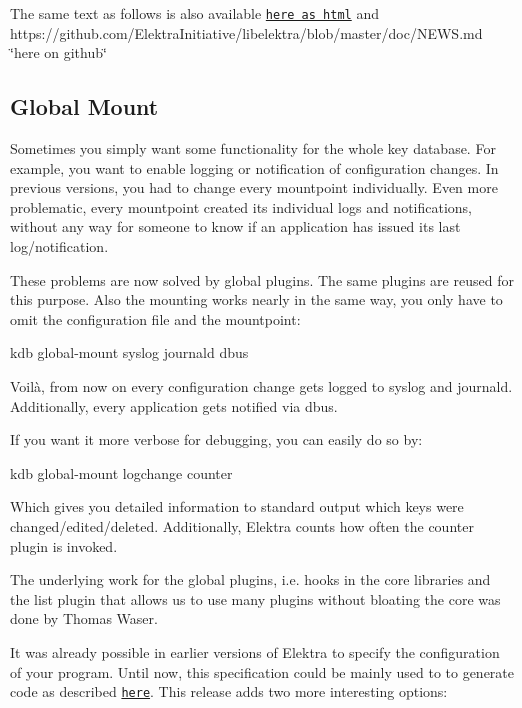 The same text as follows is also available \href{http://doc.libelektra.org/news/1ab4a560-c286-46d2-a058-1a8e7e208fe8.html}{\tt here as html} and https\+://github.com/\+Elektra\+Initiative/libelektra/blob/master/doc/\+N\+E\+W\+S.\+md \char`\"{}here on github\char`\"{}

\subsection*{Global Mount}

Sometimes you simply want some functionality for the whole key database. For example, you want to enable logging or notification of configuration changes. In previous versions, you had to change every mountpoint individually. Even more problematic, every mountpoint created its individual logs and notifications, without any way for someone to know if an application has issued its last log/notification.

These problems are now solved by global plugins. The same plugins are reused for this purpose. Also the mounting works nearly in the same way, you only have to omit the configuration file and the mountpoint\+: \begin{DoxyVerb}    kdb global-mount syslog journald dbus
\end{DoxyVerb}


Voilà, from now on every configuration change gets logged to syslog and journald. Additionally, every application gets notified via dbus.

If you want it more verbose for debugging, you can easily do so by\+: \begin{DoxyVerb}    kdb global-mount logchange counter
\end{DoxyVerb}


Which gives you detailed information to standard output which keys were changed/edited/deleted. Additionally, Elektra counts how often the {\ttfamily counter} plugin is invoked.

The underlying work for the global plugins, i.\+e. hooks in the core libraries and the {\ttfamily list} plugin that allows us to use many plugins without bloating the core was done by Thomas Waser.

It was already possible in earlier versions of Elektra to specify the configuration of your program. Until now, this specification could be mainly used to to generate code as described \href{https://github.com/ElektraInitiative/libelektra/tree/master/src/tools/gen}{\tt here}. This release adds two more interesting options\+:


